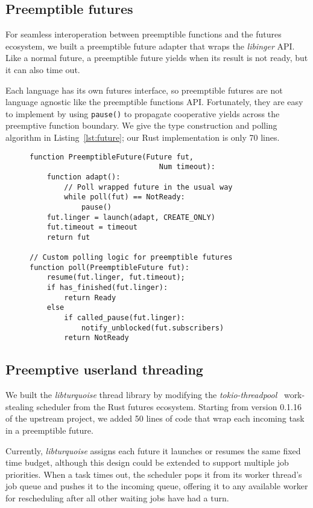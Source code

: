 \subsection{Preemptible futures}

For seamless interoperation between preemptible functions and the futures ecosystem,
we built a preemptible future adapter that wraps the \textit{libinger} API.  Like a
normal future, a preemptible future yields when its result is not ready, but it can
also time out.

Each language has its own futures interface, so preemptible futures are not language
agnostic like the preemptible functions API.  Fortunately, they are easy to implement
by using
\texttt{pause()} to propagate cooperative yields across the preemptive function
boundary.  We give the type construction and polling algorithm in
Listing~\ref{lst:future}; our Rust implementation is only 70 lines.

\begin{figure}
\begin{lstlisting}[label=lst:future,caption=Futures adapter type (pseudocode)]
function PreemptibleFuture(Future fut,
                              Num timeout):
	function adapt():
		// Poll wrapped future in the usual way
		while poll(fut) == NotReady:
			pause()
	fut.linger = launch(adapt, CREATE_ONLY)
	fut.timeout = timeout
	return fut

// Custom polling logic for preemptible futures
function poll(PreemptibleFuture fut):
	resume(fut.linger, fut.timeout);
	if has_finished(fut.linger):
		return Ready
	else
		if called_pause(fut.linger):
			notify_unblocked(fut.subscribers)
		return NotReady
\end{lstlisting}
\end{figure}


\subsection{Preemptive userland threading}

We built the \textit{libturquoise} thread library by modifying the
\textit{tokio-threadpool}~\cite{www-tokio-threadpool} work-stealing scheduler from
the Rust futures ecosystem.  Starting from version 0.1.16 of the upstream project, we
added 50 lines of code that wrap each incoming task in a preemptible future.

Currently, \textit{libturquoise} assigns each future it launches or resumes the same
fixed time budget, although this design could be extended to support
multiple job priorities.  When a task times out, the scheduler pops it from its
worker thread's job queue and pushes it to the incoming queue,
offering it to any available worker for rescheduling after all other waiting jobs
have had a turn.
